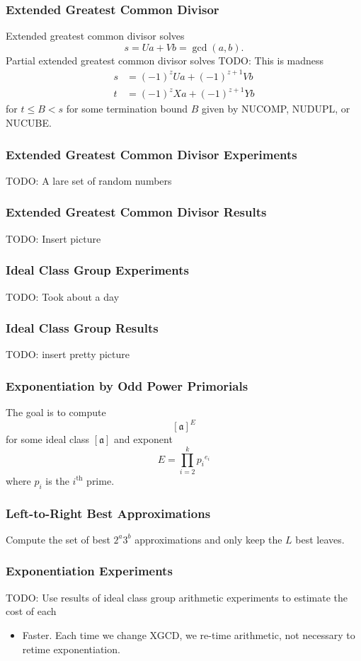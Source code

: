 \documentclass{beamer}
\newcommand{\ideal}{\mathfrak}
\newcommand{\idealclass}[1]{\left[ \ideal #1 \right]}
\newcommand{\aclass}{\idealclass a}
\newcommand{\ith}{i^{\textrm{th}}}
\begin{document}
\begin{frame}
\frametitle{Extended Greatest Common Divisor}
Extended greatest common divisor solves
\[
	s = Ua + Vb = \gcd(a, b).
\]
Partial extended greatest common divisor solves
TODO: This is madness
\begin{eqnarray*}
	s &= (-1)^z Ua + (-1)^{z+1} Vb \\
	t &= (-1)^z Xa + (-1)^{z+1} Yb
\end{eqnarray*}
for $t \le B < s$ for some termination bound $B$ given by NUCOMP, NUDUPL, or NUCUBE.

\end{frame}

\begin{frame}
\frametitle{Extended Greatest Common Divisor Experiments}
TODO: A lare set of random numbers
\end{frame}

\begin{frame}
\frametitle{Extended Greatest Common Divisor Results}
TODO: Insert picture
\end{frame}

\begin{frame}
\frametitle{Ideal Class Group Experiments}
TODO: Took about a day
\end{frame}

\begin{frame}
\frametitle{Ideal Class Group Results}
TODO: insert pretty picture
\end{frame}

\begin{frame}
\frametitle{Exponentiation by Odd Power Primorials}
The goal is to compute
\[
\aclass ^ E
\]
for some ideal class $\aclass$ and exponent
\[
	E = \prod_{i=2}^k {p_i}^{e_i}
\]
where $p_i$ is the $\ith$ prime.
\end{frame}

\begin{frame}
\frametitle{Left-to-Right Best Approximations}
Compute the set of best $2^a3^b$ approximations and only keep the $L$ best leaves.
\end{frame}

\begin{frame}
\frametitle{Exponentiation Experiments}
TODO: Use results of ideal class group arithmetic experiments to estimate the cost of each
\begin{itemize}
\item Faster.  Each time we change XGCD, we re-time arithmetic, not necessary to retime exponentiation.
\end{itemize}
\end{frame}
\end{document}

